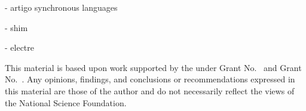 \documentclass[sigplan,10pt,review,anonymous]{acmart}\settopmatter{printfolios=true,printccs=false,printacmref=false}
\begin{document}
- artigo synchronous languages

- shim

- electre

\begin{acks}                            %
  This material is based upon work supported by the
   under Grant
  No.~ and Grant
  No.~.  Any opinions, findings, and
  conclusions or recommendations expressed in this material are those
  of the author and do not necessarily reflect the views of the
  National Science Foundation.
\end{acks}


\end{document}
